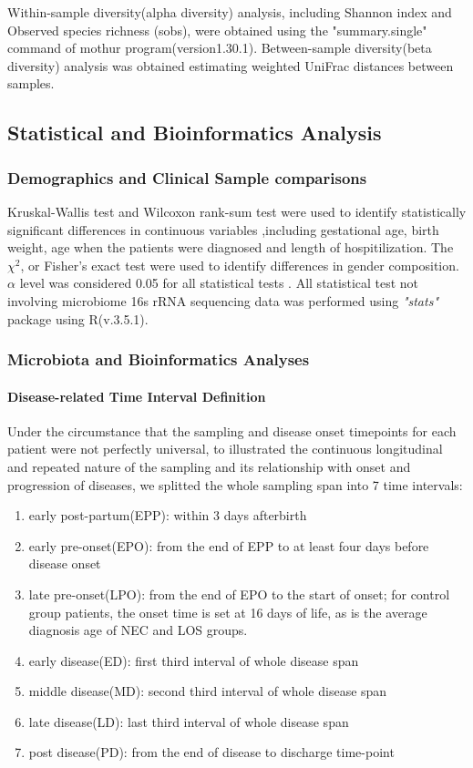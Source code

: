 \documentclass[fleqn,10pt, lineno]{wlpeerj} %
\begin{document}
  \noindent
   Within-sample diversity(alpha diversity) analysis, including Shannon index and Observed species richness (sobs), were obtained using the "summary.single" command of mothur program(version1.30.1)\citep{schloss2009introducing}. Between-sample diversity(beta diversity) analysis was obtained estimating weighted UniFrac distances between samples.

  \subsection*{Statistical and Bioinformatics Analysis}
    \subsubsection*{Demographics and Clinical Sample comparisons}
    Kruskal-Wallis test and Wilcoxon rank-sum test were used to identify statistically significant differences in continuous variables ,including gestational age, birth weight, age when the patients were diagnosed and length of hospitilization. The $\chi^2$, or Fisher's exact test were used to identify differences in gender composition. $\alpha$ level was considered 0.05 for all statistical tests . All statistical test not involving microbiome 16s rRNA sequencing data was performed using \textit{"stats"} package using R(v.3.5.1).
    \subsubsection*{Microbiota and Bioinformatics Analyses}
      \paragraph*{Disease-related Time Interval Definition}
      Under the circumstance that the sampling and disease onset timepoints for each patient were not perfectly universal, to illustrated the continuous longitudinal and repeated nature of the sampling and its relationship with onset and progression of diseases, we splitted the whole sampling span into 7 time intervals:
        \begin{enumerate}[noitemsep]
          \item early post-partum(EPP): within 3 days afterbirth
          \item early pre-onset(EPO): from the end of EPP to at least four days before disease onset
          \item late pre-onset(LPO): from the end of EPO to the start of onset; for control group patients, the onset time is set at 16 days of life, as is the average diagnosis age of NEC and LOS groups.
          \item early disease(ED): first third interval of whole disease span
          \item middle disease(MD): second third interval of whole disease span
          \item late disease(LD): last third interval of whole disease span
          \item post disease(PD): from the end of disease to discharge time-point
        \end{enumerate}
\end{document}
